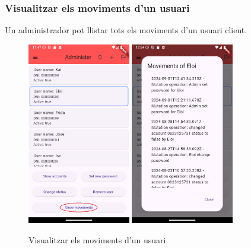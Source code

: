 \documentclass[a4paper,12pt,twoside]{ThesisStyle}
\begin{document}
\clearpage
\subsubsection{Visualitzar els moviments d'un usuari}
\label{subsubsec: Visualitzar els moviments d'un usuari}


Un administrador pot llistar tots els moviments d'un usuari client.

\begin{figure}[h]
    \centering
    \includegraphics[width=0.4\textwidth]{imatges/mainAdmin5.png}
    \includegraphics[width=0.4\textwidth]{imatges/movements.png}
    \caption{Visualitzar els moviments d'un usuari}
    \label{fig: Visualitzar els moviments d'un usuari}
\end{figure}
\end{document}
